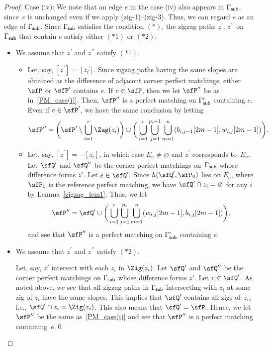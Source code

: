 \begin{proof}
Case (iv): We note that an edge $e$ in the case (iv) also appears in $\Gamma_{\sf sub}$, since~$e$ is unchanged even if we apply (zig-1)--(zig-3).
Thus, we can regard $e$ as an edge of $\Gamma_{\sf sub}$.
Since $\Gamma_{\sf sub}$ satisfies the condition $(*)$, the zigzag paths $z^\prime$, $z^{\prime\prime}$ on~$\Gamma_{\sf sub}$ that contain $e$ satisfy
either $(*1)$ or $(*2)$.
\begin{itemize}\itemsep=0pt
\item We assume that $z^\prime$ and $z^{\prime\prime}$ satisfy $(*1)$.
\begin{itemize}\itemsep=0pt
\item Let, say, $[z^\prime]=[z_i]$.
Since zigzag paths having the same slopes are obtained as the difference of adjacent corner perfect matchings, either $\sfP$ or $\sfP^\prime$ contains $e$.
If $e \in \sfP$, then we let $\sfP^{\prime\prime}$ be as in~\eqref{PM_case(i)}.
Then, $\sfP^{\prime\prime}$ is a perfect matching on $\Gamma^\prime_{\sf sub}$ containing $e$.
Even if $e \in \sfP^\prime$, we have the same conclusion by letting
\begin{displaymath}
\sfP^{\prime\prime}=\bigg(\sfP^\prime \setminus \bigcup_{i=1}^r \Zag(z_i)\bigg) \cup \bigg(\bigcup_{i=1}^r \bigcup_{j=1}^{p_i+1} \bigcup_{m=1}^n(b_{i,j-1}[2m-1],w_{i,j}[2m-1])\bigg).
\end{displaymath}
\item Let, say, $[z^\prime]=-[z_i]$, in which case $E_a\neq \varnothing$ and $z^\prime$ corresponds to~$E_a$.
Let $\sfQ^\prime$ and $\sfQ^{\prime\prime}$ be the corner perfect matchings on~$\Gamma_{\sf sub}$ whose difference forms $z'$. Let $e \in \sfQ^\prime$.
Since $h(\sfQ^\prime,\sfP_0)$ lies on $E_a$, where $\sfP_0$ is the reference perfect matching, we have $\sfQ^\prime\cap z_i=\varnothing$ for any $i$ by Lemma~\ref{zigzag_lem1}.
Thus, we let
\begin{displaymath}
\sfP^{\prime\prime}=\sfQ^\prime \cup \bigg(\bigcup_{i=1}^r \bigcup_{j=1}^{p_i} \bigcup_{m=1}^n(w_{i,j}[2m-1],b_{i,j}[2m-1])\bigg),
\end{displaymath}
and see that $\sfP^{\prime\prime}$ is a perfect matching on $\Gamma^\prime_{\sf sub}$ containing $e$.
\end{itemize}
\item We assume that $z^\prime$ and $z^{\prime\prime}$ satisfy $(*2)$.

Let, say, $z'$ intersect with each $z_i$ in $\Zig(z_i)$. Let $\sfQ^\prime$ and $\sfQ^{\prime\prime}$ be the corner perfect matchings on $\Gamma_{\sf sub}$ whose difference forms $z'$. Let $e \in \sfQ^\prime$.
As noted above, we see that all zigzag paths in $\Gamma_{\sf sub}$ intersecting with $z_i$ at some zig of $z_i$ have the same slopes.
This implies that $\sfQ^\prime$ contains all zigs of~$z_i$, i.e., $\sfQ^\prime \cap z_i=\Zig(z_i)$. This also means that $\sfQ^\prime=\sfP$.
Hence, we let~$\sfP^{\prime\prime}$ be the same as~\eqref{PM_case(i)} and see that $\sfP^{\prime\prime}$ is a perfect matching containing~$e$.\hfill\qed
\end{itemize}
\renewcommand{\qed}{}
\end{proof}

